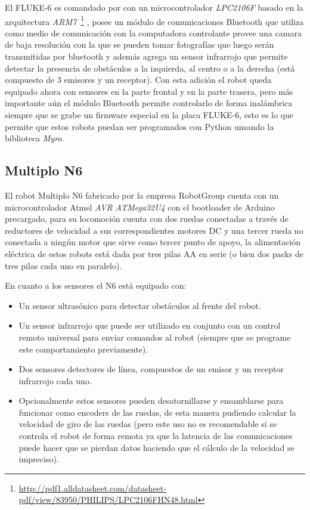 El FLUKE-6 es comandado por con un microcontrolador \textit{LPC2106F} basado
en la arquitectura
\textit{ARM7}~\footnote{\url{http://pdf1.alldatasheet.com/datasheet-pdf/view/83950/PHILIPS/LPC2106FHN48.html}}
, posee un módulo de comunicaciones
Bluetooth que utiliza como medio de comunicación con la computadora
controlante
provee una camara de baja resolución con la que se pueden tomar fotografías
que luego serán transmitidas por bluetooth y además agrega
un sensor infrarrojo que permite detectar la presencia de obstáculos
a la izquierda, al centro o a la derecha (está compuesto de 3 emisores
y un receptor). Con esta adición el robot queda equipado ahora con sensores
en la parte frontal y en la parte trasera, pero más importante aún
el módulo Bluetooth permite controlarlo de forma inalámbrica siempre
que se grabe un firmware especial en la placa FLUKE-6, esto es lo que permite
que estos robots puedan ser programados con Python unsando la biblioteca
\textit{Myro}.

\subsection{Multiplo N6}
El robot Multiplo N6 fabricado por la empresa RobotGroup cuenta con un
microcontrolador Atmel \textit{AVR ATMega32U4} con el bootloader de Arduino
precargado, para su locomoción cuenta con dos ruedas conectadas a través
de reductores de velocidad a sus correspondientes motores DC y una tercer
rueda no conectada a ningún motor que sirve como tercer punto de apoyo,
la alimentación eléctrica de estos robots está dada por tres pilas AA
en serie (o bien dos packs de tres pilas cada uno en paralelo).

En cuanto a los sensores el N6 está equipado con:
\begin{itemize}
    \item Un sensor ultrasónico para detectar obstáculos al frente del
        robot.
    \item Un sensor infrarrojo que puede ser utilizado en conjunto con
        un control remoto universal para enviar comandos al robot
        (siempre que se programe este comportamiento previamente).
    \item Dos sensores detectores de línea, compuestos de un emisor y
        un receptor infrarrojo cada uno.
    \item Opcionalmente estos sensores pueden desatornillarse y ensamblarse
        para funcionar como encoders de las ruedas, de esta manera pudiendo
        calcular la velocidad de giro de las ruedas (pero este uso
        no es recomendable si se controla el robot de forma remota
        ya que la latencia de las comunicaciones puede hacer que se pierdan
        datos haciendo que el cálculo de la velocidad se impreciso).
\end{itemize}

